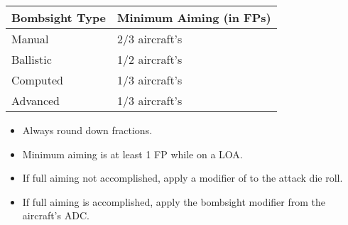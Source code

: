 
\begin{onecolumntablefloat}
\begin{onecolumntable}

\begin{tabularx}{0.7\linewidth}{lP}
\toprule
Bombsight Type  &Minimum Aiming (in FPs)\\
\midrule
Manual 	        &2/3 aircraft's \\
Ballistic	    &1/2 aircraft's \\
Computed	    &1/3 aircraft's \\
Advanced	    &1/3 aircraft's \\
\bottomrule
\end{tabularx}
\begin{tablenote}{0.7\linewidth}
\begin{itemize}
\item Always round down fractions.
\item Minimum aiming is at least 1 FP while on a LOA.
\item If full aiming not accomplished, apply a modifier of  to the attack die roll.
\item If full aiming is accomplished, apply the bombsight modifier from the aircraft's ADC.
\end{itemize}
\end{tablenote}

\end{onecolumntable}
\end{onecolumntablefloat}
